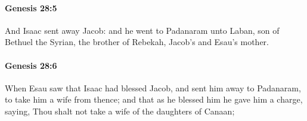 		\paragraph{Genesis 28:5} %
			\label{GENESIS-28-5}

			And Isaac sent away Jacob: and he went to Padanaram unto Laban, son of Bethuel the Syrian, the brother of Rebekah, Jacob's and Esau's mother.


		\paragraph{Genesis 28:6} %
			\label{GENESIS-28-6}

			When Esau saw that Isaac had blessed Jacob, and sent him away to Padanaram, to take him a wife from thence; and that as he blessed him he gave him a charge, saying, Thou shalt not take a wife of the daughters of Canaan;


